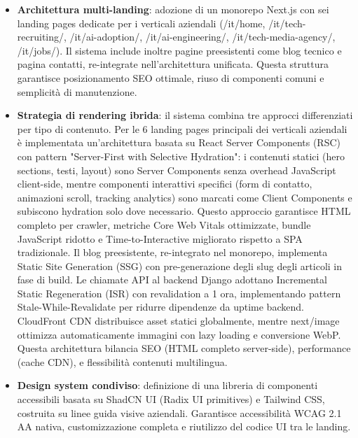 \begin{itemize}
  \item \textbf{Architettura multi-landing}: adozione di un monorepo Next.js 
  con sei landing pages dedicate per i verticali aziendali (/it/home, 
  /it/tech-recruiting/, /it/ai-adoption/, /it/ai-engineering/, 
  /it/tech-media-agency/, /it/jobs/). Il sistema include inoltre pagine 
  preesistenti come blog tecnico e pagina contatti, re-integrate 
  nell'architettura unificata. Questa struttura garantisce posizionamento 
  SEO ottimale, riuso di componenti comuni e semplicità di manutenzione.
  
  \item \textbf{Strategia di rendering ibrida}: il sistema combina tre approcci 
  differenziati per tipo di contenuto. Per le 6 landing pages principali dei 
  verticali aziendali è implementata un'architettura basata su React Server 
  Components (RSC) con pattern "Server-First with Selective Hydration": i contenuti 
  statici (hero sections, testi, layout) sono Server Components senza overhead 
  JavaScript client-side, mentre componenti interattivi specifici (form di contatto, 
  animazioni scroll, tracking analytics) sono marcati come Client Components e 
  subiscono hydration solo dove necessario. Questo approccio garantisce HTML 
  completo per crawler, metriche Core Web Vitals ottimizzate, bundle JavaScript 
  ridotto e Time-to-Interactive migliorato rispetto a SPA tradizionale. Il blog 
  preesistente, re-integrato nel monorepo, implementa Static Site Generation (SSG) 
  con pre-generazione degli slug degli articoli in fase di build. Le chiamate API 
  al backend Django adottano Incremental Static Regeneration (ISR) con revalidation 
  a 1 ora, implementando pattern Stale-While-Revalidate per ridurre dipendenze da 
  uptime backend. CloudFront CDN distribuisce asset statici globalmente, mentre 
  next/image ottimizza automaticamente immagini con lazy loading e conversione WebP. 
  Questa architettura bilancia SEO (HTML completo server-side), performance (cache CDN), 
  e flessibilità contenuti multilingua.
  
  \item \textbf{Design system condiviso}: definizione di una libreria di componenti 
  accessibili basata su ShadCN UI (Radix UI primitives) e Tailwind CSS, costruita 
  su linee guida visive aziendali. Garantisce accessibilità WCAG 2.1 AA nativa, 
  customizzazione completa e riutilizzo del codice UI tra le landing.
\end{itemize}

